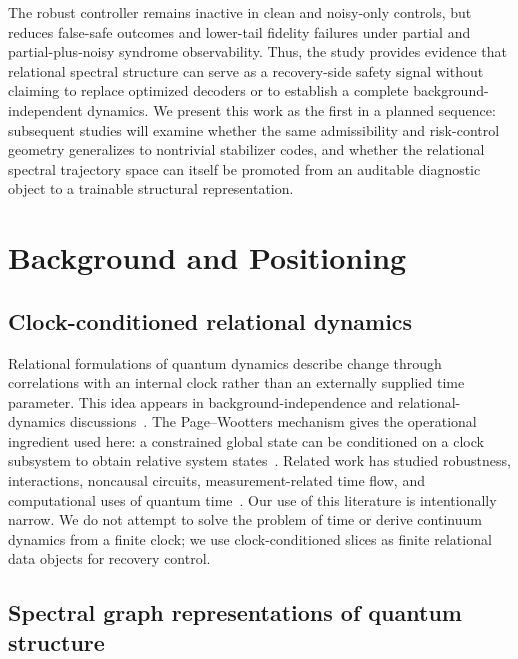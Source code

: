 \documentclass{iopjournal}
\begin{document}
The robust controller remains inactive in clean and noisy-only controls, but reduces 
false-safe outcomes and lower-tail fidelity failures under partial and partial-plus-noisy 
syndrome observability. Thus, the study provides evidence that relational spectral 
structure can serve as a recovery-side safety signal without claiming to replace 
optimized decoders or to establish a complete background-independent dynamics.
We present this work as the first in a planned sequence: subsequent studies will 
examine whether the same admissibility and risk-control geometry generalizes to 
nontrivial stabilizer codes, and whether the relational spectral trajectory space 
can itself be promoted from an auditable diagnostic object to a trainable structural 
representation.

\section{Background and Positioning}
\subsection{Clock-conditioned relational dynamics}

Relational formulations of quantum dynamics describe change through correlations
with an internal clock rather than an externally supplied time parameter. This
idea appears in background-independence and relational-dynamics
discussions~\cite{Smolin2005BackgroundIndependence,Rovelli2007QuantumGravity}.
The Page--Wootters mechanism gives the operational ingredient used here: a
constrained global state can be conditioned on a clock subsystem to obtain
relative system states~\cite{Giovannetti2015QuantumTime,Marletto2017EvolutionWithoutEvolution,Hoehn2021TrinityRelationalQuantumDynamics}.
Related work has studied robustness, interactions, noncausal circuits,
measurement-related time flow, and computational uses of quantum
time~\cite{Rijavec2023RobustnessPageWootters,Mendes2021NonlinearPageWootters,Baumann2022NoncausalPageWoottersCircuits,Paiva2022FlowTimeEnergyMeasurements,Diaz2025ParallelPageWoottersSimulation}.
Our use of this literature is intentionally narrow. We do not attempt to solve
the problem of time or derive continuum dynamics from a finite clock; we use
clock-conditioned slices as finite relational data objects for recovery control.

\subsection{Spectral graph representations of quantum structure}
\end{document}
